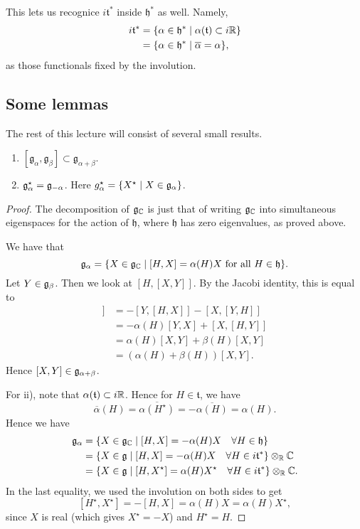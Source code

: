 \documentclass[11pt, english]{article}
\begin{document}
This lets us recognice $i \mathfrak t^\ast$ inside $\mathfrak h^\ast$ as well. Namely,
\begin{align*}
  i \mathfrak t^\ast &= \{ \alpha \in \mathfrak h^\ast \mid \alpha(\mathfrak t) \subset i \mathbb{R} \} \\
&= \{ \alpha \in \mathfrak h ^\ast \mid \overline \alpha = \alpha \},
\end{align*}
as those functionals fixed by the involution.

\subsection{Some lemmas}

The rest of this lecture will consist of several small results.

\begin{lemma}
\label{lemmadecomp}
  \begin{enumerate}
We have a decomposition $$\g_\C = \mathfrak h \oplus \bigoplus_{\alpha \in \Delta} \g_\alpha.$$ Also:
  \item $[\mathfrak g_\alpha, \mathfrak g_\beta] \subset \mathfrak g_{\alpha+\beta}$.
\item $\mathfrak g_\alpha^\star = \mathfrak g_{-\alpha}$. Here $g_\alpha^\star = \{ X^\star \mid X \in \mathfrak g_\alpha \}$.
  \end{enumerate}
\end{lemma}
\begin{proof}
The decomposition of $\mathfrak g_{\mathbb{C}}$ is just that of writing $\mathfrak g_{\mathbb{C}}$ into simultaneous eigenspaces for the action of $\mathfrak h$, where $\mathfrak h$ has zero eigenvalues, as proved above.

We have that 
$$
\mathfrak g_\alpha = \{ X \in \mathfrak g_{\mathbb{C}} \mid [H,X] = \alpha(H) X \text{ for all } H \in \mathfrak h\}.
$$
Let $Y \in \mathfrak g_\beta$. Then we look at $[H,[X,Y]]$. By the Jacobi identity, this is equal to
\begin{align*}
  [H,[X,Y]] &= -[Y,[H,X]] - [X,[Y,H]] \\
&= -\alpha(H)[Y,X] +[X,[H,Y]] \\
&= \alpha(H)[X,Y] +\beta(H)[X,Y] \\
&= (\alpha(H)+\beta(H))[X,Y].
\end{align*}
Hence $[X,Y] \in \mathfrak g_{\alpha+\beta}$.

For ii), note that $\alpha(\mathfrak t) \subset i \mathbb{R}$. Hence for $H \in \mathfrak t$, we have 
$$
\overline \alpha(H) = \overline{\alpha(H^\star)} = - \overline{\alpha(H)} = \alpha(H).
$$
Hence we have
\begin{align*}
\mathfrak g_\alpha &= \{ X \in \mathfrak g_{\mathbb{C}} \mid [H,X] = -\alpha(H)X \quad \forall H \in \mathfrak h \} \\
&= \{ X \in \mathfrak g \mid [H,X] = -\alpha(H) X \quad \forall H \in i \mathfrak t^\ast \} \otimes_{\mathbb{R}} \mathbb{C}  \\
&= \{ X \in \mathfrak g \mid [H,X^\star] = \alpha(H) X^\star \quad \forall H \in i \mathfrak t ^\ast \} \otimes_{\mathbb{R}} \mathbb{C}.
\end{align*}
In the last equality, we used the involution on both sides to get
$$
[H^\star, X^\star] = -[H,X] = \alpha(H) X = \alpha(H) X^\star,
$$
since $X$ is real (which gives $X^\star = -X$) and $H^\star=H$.
\end{proof}
\end{document}

